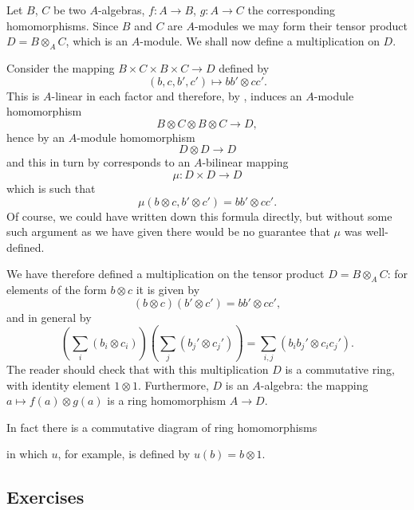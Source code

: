 Let $B$, $C$ be two $A$-algebras, $f:A\longrightarrow B$, $g:A\longrightarrow C$ the corresponding homomorphisms. Since $B$ and $C$ are $A$-modules we may form their tensor product $D=B\otimes_A C$, which is an $A$-module. We shall now define a multiplication on $D$.

Consider the mapping $B\times C\times B\times C\longrightarrow D$ defined by
\[
 (b,c,b',c')\mapsto bb'\otimes cc'.
\]
This is $A$-linear in each factor and therefore, by , induces an $A$-module homomorphism
\[
 B\otimes C\otimes B\otimes C\longrightarrow D,
\]
hence by  an $A$-module homomorphism
\[
 D\otimes D\longrightarrow D
\]
and this in turn by  corresponds to an $A$-bilinear mapping
\[
 \mu:D\times D\longrightarrow D
\]
which is such that
\[
 \mu(b\otimes c,b'\otimes c')=bb'\otimes cc'.
\]
Of course, we could have written down this formula directly, but without some such argument as we have given there would be no guarantee that $\mu$ was well-defined.

We have therefore defined a multiplication on the tensor product $D=B\otimes_A C$: for elements of the form $b\otimes c$ it is given by
\[
 (b\otimes c)(b'\otimes c')=bb'\otimes cc',
\]
and in general by
\[
 \left(\sum_i(b_i\otimes c_i)\right)\left(\sum_j(b_j'\otimes c_j')\right)
 =\sum_{i,j}(b_i b_j'\otimes c_i c_j').
\]
The reader should check that with this multiplication $D$ is a commutative ring, with identity element $1\otimes1$. Furthermore, $D$ is an $A$-algebra: the mapping $a\mapsto f(a)\otimes g(a)$ is a ring homomorphism $A\longrightarrow D$.

In fact there is a commutative diagram of ring homomorphisms

\begin{center}

\end{center}

in which $u$, for example, is defined by $u(b)=b\otimes1$.

\subsection{Exercises}

